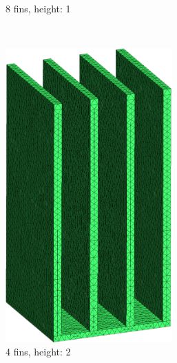 \begin{figure}[h t!]
\begin{subfigure}[t] {0.23\textwidth}
 \caption{8 fins, height: 1}
 \label{fig:mesh_8_1}
 \end{subfigure}
 ~
 \begin{subfigure}[t] {0.23\textwidth}
 \centering
 \includegraphics[width=0.7\textwidth]{"../figures/mesh_4_2 (new)"}
 \caption{4 fins, height: 2}
 \label{fig:mesh_4_2}
 \end{subfigure}
 ~
 \begin{subfigure}[t] {0.23\textwidth}
 \centering

\end{subfigure}
\end{figure}
